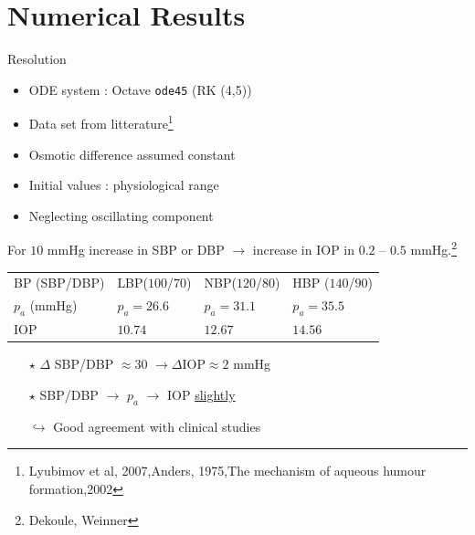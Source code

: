 \section{Numerical Results}
\frame{\sectionpage}
\begin{frame}{Resolution}
\begin{itemize}
\item ODE system : Octave \texttt{ode45} (RK (4,5))
\item Data set from litterature\footnote{Lyubimov et al, 2007,Anders, 1975,The mechanism of aqueous humour formation,2002}
\item Osmotic difference assumed constant
\item Initial values : physiological range
\item Neglecting oscillating component
\end{itemize}

\end{frame}
\begin{frame}

\end{frame}
\begin{frame}
\alert{For $10$ mmHg increase in SBP or DBP $\rightarrow$ increase in IOP in $0.2$ -- $0.5$ mmHg.}\footnote{Dekoule, Weinner}
\bigskip


\begin{tabular}{|l|l|l|l|}
\hline
BP (SBP/DBP)& LBP($100$/$70$)&NBP($120$/$80$) & HBP ($140$/$90$)\\
$p_a$ (mmHg)& $p_a = 26.6$ & $p_a = 31.1$ & $p_a = 35.5$\\
\hline
IOP & $10.74$ & $12.67$ & $14.56$\\
\hline
\end{tabular}
\bigskip
\begin{itemize}
\item[$\star$] $\Delta$ SBP/DBP $\approx 30$ $\rightarrow \Delta$IOP$\approx 2$ mmHg\\

\item[$\star$]SBP/DBP $\rightarrow$ $p_a$ $\rightarrow$ IOP \underline{slightly}\\

\item[$\hookrightarrow$] Good agreement with clinical studies
\end{itemize}

\end{frame}
